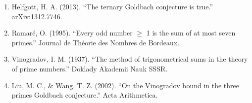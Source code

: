 \begin{enumerate}
\item Helfgott, H. A. (2013). ``The ternary Goldbach conjecture is true.'' arXiv:1312.7746.
\item Ramaré, O. (1995). ``Every odd number $\geq$ 1 is the sum of at most seven primes.'' Journal de Théorie des Nombres de Bordeaux.
\item Vinogradov, I. M. (1937). ``The method of trigonometrical sums in the theory of prime numbers.'' Doklady Akademii Nauk SSSR.
\item Liu, M. C., \& Wang, T. Z. (2002). ``On the Vinogradov bound in the three primes Goldbach conjecture.'' Acta Arithmetica.
\end{enumerate}
